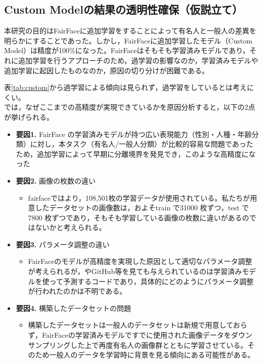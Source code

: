 \documentclass[a4paper,11pt,titlepage]{jsarticle}
\begin{document}
\subsection{Custom Modelの結果の透明性確保（仮説立て）}
本研究の目的はFairFaceに追加学習をすることによって有名人と一般人の差異を明らかにすることであった。しかし，FairFaceに追加学習したモデル（Custom Model）は精度が100\%になった。FairFaceはそもそも学習済みモデルであり，それに追加学習を行うアプローチのため，過学習の影響なのか，学習済みモデルや追加学習に起因したものなのか，原因の切り分けが困難である。\par
表\ref{tab:custom}から過学習による傾向は見られず，過学習をしているとは考えにくい。\\
では，なぜここまでの高精度が実現できているかを原因分析すると，以下の2点が挙げられる。
\begin{itemize}	
	\item \textbf{要因1.} FairFace の学習済みモデルが持つ広い表現能力（性別・人種・年齢分類）に対し，本タスク（有名人/一般人分類）が比較的容易な問題であったため，追加学習によって早期に分離境界を発見でき，このような高精度になった
	\item \textbf{要因2.} 画像の枚数の違い
	\begin{itemize}
		\item fairfaceでは\cite{karkkainenFairFace}より，108,501枚の学習データが使用されている。私たちが用意したデータセットの画像数は，およそtrain で31000 枚ずつ，test で7800 枚ずつであり，そもそも学習している画像の枚数に違いがあるのではないかと考えられる。
	\end{itemize}
	\item \textbf{要因3.} パラメータ調整の違い
	\begin{itemize}
		\item FairFaceのモデルが高精度を実現した原因として適切なパラメータ調整が考えられるが，\cite{karkkainenFairFace}やGitHub等を見ても与えられているのは学習済みモデルを使って予測するコードであり，具体的にどのようにパラメータ調整が行われたのかは不明である。
	\end{itemize}
	\item \textbf{要因4.} 構築したデータセットの問題
	\begin{itemize}
		\item 構築したデータセットは一般人のデータセットは新規で用意しておらず，FairFaceの学習済みモデルですでに使用された画像データをダウンサンプリングした上で再度有名人の画像群とともに学習させている。そのため一般人のデータを学習時に背景を見る傾向にある可能性がある。
	\end{itemize}
\end{itemize}
\end{document}
